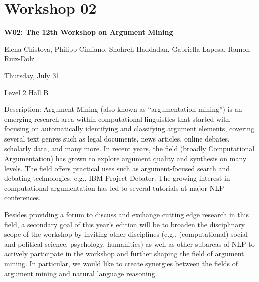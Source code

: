 \clearpage



\section[W02: The 12th Workshop on Argument Mining]{Workshop 02}
\label{workshop_2}

\begin{center}
    {\Large \textbf{W02: The 12th Workshop on Argument Mining}}

    Elena Chistova, Philipp Cimiano, Shohreh Haddadan, Gabriella Lapesa, Ramon Ruiz-Dolz                                                                                                                                                                                                

    Thursday, July 31
    
    Level 2 Hall B

\end{center}
	
Description: Argument Mining (also known as “argumentation mining”) is an emerging research area within computational linguistics that started with focusing on automatically identifying and classifying argument elements, covering several text genres such as legal documents, news articles, online debates, scholarly data, and many more. In recent years, the field (broadly Computational Argumentation) has grown to explore argument quality and synthesis on many levels. The field offers practical uses such as argument-focused search and debating technologies, e.g., IBM Project Debater. The growing interest in computational argumentation has led to several tutorials at major NLP conferences.

Besides providing a forum to discuss and exchange cutting edge research in this field, a secondary goal of this year's edition will be to broaden the disciplinary scope of the workshop by inviting other disciplines (e.g., (computational) social and political science, psychology, humanities) as well as other subareas of NLP to actively participate in the workshop and further shaping the field of argument mining. In particular, we would like to create synergies between the fields of argument mining and natural language reasoning.	
